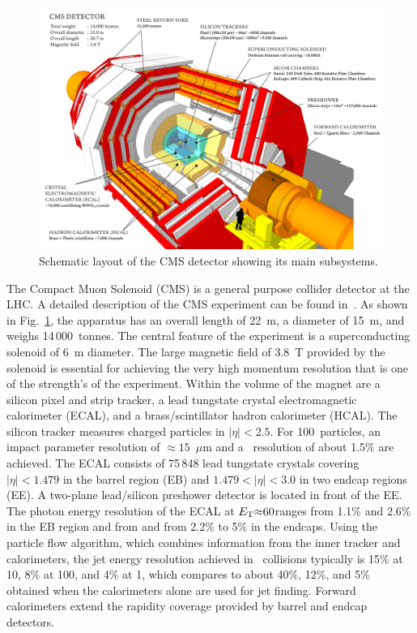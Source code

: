 \begin{figure}[!t]
\begin{center}
\includegraphics[height=0.49\textwidth]{introduction_figs/cms_120918_03.png}
\caption{Schematic layout of the CMS detector showing its main subsystems.}
\label{figs:CMSdet}
\end{center}
\end{figure}
The Compact Muon Solenoid (CMS) is a general purpose collider detector at the LHC. A detailed description of the CMS experiment
can be found in~\cite{Chatrchyan:2008zzk}.
As shown in Fig.~\ref{figs:CMSdet},  the apparatus has an overall length of 22~m, a diameter of 15~m, and weighs 14\,000~tonnes.
The central feature of the experiment is a superconducting solenoid
of 6~m diameter. The large magnetic field of 3.8~T provided by the solenoid is essential for achieving
the very high momentum resolution that is one of the strength's of the experiment.
Within the volume of the magnet are a silicon pixel and strip tracker, a lead tungstate crystal
electromagnetic calorimeter (ECAL), and a brass/scintillator hadron calorimeter (HCAL).
The silicon tracker measures charged particles in $|\eta|< 2.5$.
For 100\GeVc\ particles, an impact parameter resolution of $\approx 15$~$\mu$m and a \pT\
resolution of about 1.5\% are achieved.
The ECAL consists of 75\,848 lead tungstate crystals covering $|\eta|< 1.479 $ in the
barrel region (EB) and $1.479 < |\eta| < 3.0$ in two endcap regions (EE).
A two-plane lead/silicon preshower detector is located  in front of the EE.
The photon energy resolution of the ECAL at  $E_{\rm T} {\approx} 60$\GeV ranges from
 1.1\% and 2.6\% in the EB region and from and from 2.2\% to 5\% in the
endcaps.
Using the particle flow algorithm, which combines information from the inner tracker
and calorimeters, the jet energy resolution achieved in \pp\ collisions typically
is 15\% at 10\GeV, 8\% at 100\GeV, and 4\% at 1\TeV,
which compares to about 40\%, 12\%, and 5\% obtained when the calorimeters alone
are used for jet finding.
Forward calorimeters extend the rapidity coverage provided by barrel and endcap detectors.

